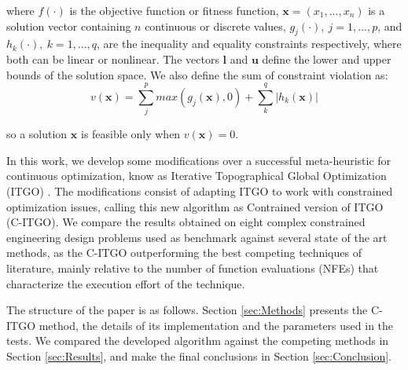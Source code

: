 \noindent
where $f(\cdot)$ is the objective function or fitness function, $\bm{x} = (x_1, ..., x_n)$ is a solution vector containing $n$ continuous or discrete values, $g_j(\cdot), \ j = 1, ..., p$, and $h_k(\cdot), \ k = 1, ..., q$, are the inequality and equality constraints respectively, where both can be linear or nonlinear. The vectors $\bm{l}$ and $\bm{u}$ define the lower and upper bounds of the solution space. We also define the sum of constraint violation as: \\[-3em]

\begin{equation}\label{eq:viol}
    v(\bm{x}) = \sum_j^p max(g_j(\bm{x}), 0) + \sum_k^q |h_k(\bm{x})|
\end{equation}

\noindent
so a solution $\bm{x}$ is feasible only when $v(\bm{x}) = 0$. 

In this work, we develop some modifications over a successful meta-heuristic for continuous optimization, know as Iterative Topographical Global Optimization (ITGO) \citep{ITGO0}. The modifications consist of adapting ITGO to work with constrained optimization issues, calling this new algorithm as Contrained version of ITGO (C-ITGO). We compare the results obtained on eight complex constrained engineering design problems used as benchmark against several state of the art methods, as the C-ITGO outperforming the best competing techniques of literature, mainly relative to the number of function evaluations (NFEs) that characterize the execution effort of the technique.

The structure of the paper is as follows. Section \ref{sec:Methods} presents the C-ITGO method, the details of its implementation and the parameters used in the tests. We compared the developed algorithm against the competing methods in Section \ref{sec:Results}, and make the final conclusions in Section \ref{sec:Conclusion}.